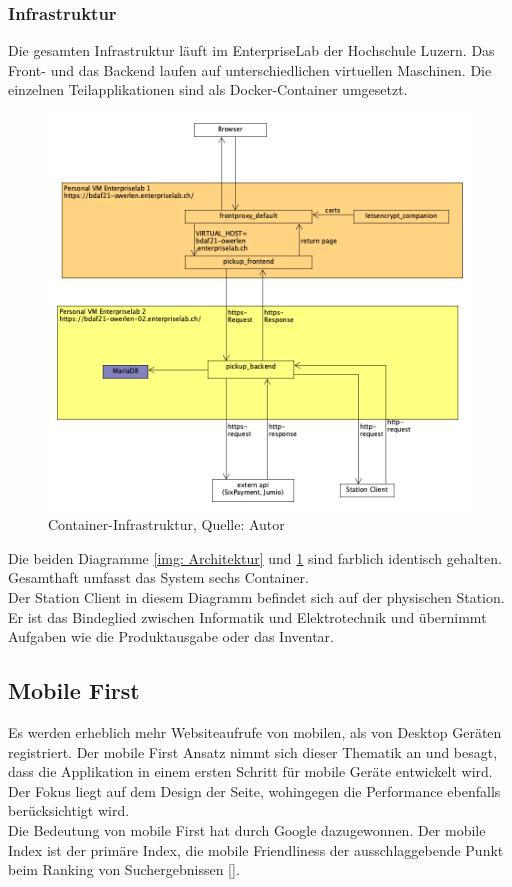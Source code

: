 \subsubsection{Infrastruktur}
Die gesamten Infrastruktur läuft im \gls{EnterpriseLab} der Hochschule Luzern. Das Front- und das Backend laufen auf unterschiedlichen virtuellen Maschinen. Die einzelnen Teilapplikationen sind als Docker-Container umgesetzt. 
\begin{figure}[H]
	\centering
	\includegraphics[width=\linewidth]{images/system.png}
	\caption[Container-Infrastruktur]{Container-Infrastruktur, Quelle: Autor}
	\label{img: Containerinfrastruktur}
\end{figure}

Die beiden Diagramme \ref{img: Architektur} und \ref{img: Containerinfrastruktur} sind farblich identisch gehalten. 
Gesamthaft umfasst das System sechs Container.\\
Der Station Client in diesem Diagramm befindet sich auf der physischen Station. Er ist das Bindeglied zwischen Informatik und Elektrotechnik und übernimmt Aufgaben wie die Produktausgabe oder das Inventar. 

\subsection{Mobile First}
Es werden erheblich mehr Websiteaufrufe von mobilen, als von Desktop Geräten registriert. Der mobile First Ansatz nimmt sich dieser Thematik an und besagt, dass die Applikation in einem ersten Schritt für mobile Geräte entwickelt wird. Der Fokus liegt auf dem Design der Seite, wohingegen die Performance ebenfalls berücksichtigt wird.\\
Die Bedeutung von mobile First hat durch Google dazugewonnen. Der mobile Index ist der primäre Index, die mobile Friendliness der ausschlaggebende Punkt beim Ranking von Suchergebnissen [\cite{mobileFirst}]. 
